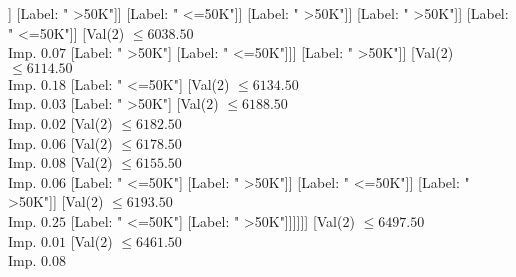 \documentclass[margin=10pt]{standalone}
\begin{document}
\begin{forest}
																							[Val($2$) $ \leq 6009.50$ \\ Imp. $0.02$
																								[Val($2$) $ \leq 5984.50$ \\ Imp. $0.01$
																									[Val($2$) $ \leq 5977.50$ \\ Imp. $0.05$
																										[Val($2$) $ \leq 5963.50$ \\ Imp. $0.02$
																											[Val($2$) $ \leq 5958.50$ \\ Imp. $0.13$
																												[Val($2$) $ \leq 5939.50$ \\ Imp. $0.07$
																													[Val($2$) $ \leq 5937.50$ \\ Imp. $0.09$
																														[Label: " >50K"]
																														[Label: " <=50K"]]
																													[Label: " >50K"]]
																												[Label: " <=50K"]]
																											[Label: " >50K"]]
																										[Label: " >50K"]]
																									[Label: " <=50K"]]
																								[Val($2$) $ \leq 6038.50$ \\ Imp. $0.07$
																									[Label: " >50K"]
																									[Label: " <=50K"]]]
																							[Label: " >50K"]]
																						[Val($2$) $ \leq 6114.50$ \\ Imp. $0.18$
																							[Label: " <=50K"]
																							[Val($2$) $ \leq 6134.50$ \\ Imp. $0.03$
																								[Label: " >50K"]
																								[Val($2$) $ \leq 6188.50$ \\ Imp. $0.02$
																									[Val($2$) $ \leq 6182.50$ \\ Imp. $0.06$
																										[Val($2$) $ \leq 6178.50$ \\ Imp. $0.08$
																											[Val($2$) $ \leq 6155.50$ \\ Imp. $0.06$
																												[Label: " <=50K"]
																												[Label: " >50K"]]
																											[Label: " <=50K"]]
																										[Label: " >50K"]]
																									[Val($2$) $ \leq 6193.50$ \\ Imp. $0.25$
																										[Label: " <=50K"]
																										[Label: " >50K"]]]]]]
																					[Val($2$) $ \leq 6497.50$ \\ Imp. $0.01$
																						[Val($2$) $ \leq 6461.50$ \\ Imp. $0.08$

\end{forest}
\end{document}
